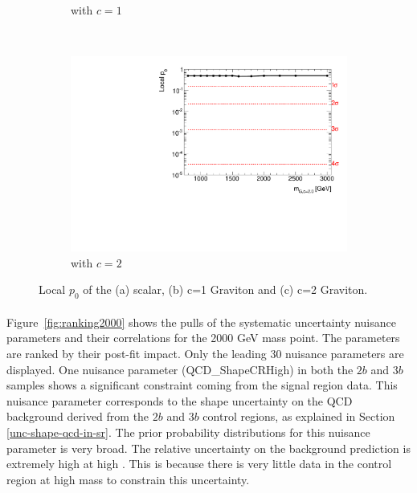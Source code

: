 \begin{figure}[htb!]
\begin{subfigure}[b]{0.35\textwidth}
        \caption{\Grav with $c=1$}
        \label{fig:localp0-g1}
    \end{subfigure}
    \\
    \hspace{-2.5cm}
    \begin{subfigure}[b]{0.35\textwidth}
        \includegraphics[width=\textwidth,angle=-90]{figures/boosted/results/p0_g20_allmasses_boosted.pdf}
        \caption{\Grav with $c=2$}
        \label{fig:localp0-g2}
    \end{subfigure}
  \caption{Local $p_0$ of the (a) scalar, (b) c=1 Graviton and (c) c=2 Graviton.}
  \label{fig:localp0}
\end{figure}

\paragraph{}
Figure~\ref{fig:ranking2000} shows the pulls of the systematic uncertainty nuisance parameters and their correlations for the 2000 GeV mass point. 
The parameters are ranked by their post-fit impact. 
Only the leading 30 nuisance parameters are displayed.
One nuisance parameter (QCD\_ShapeCRHigh) in both the $2b$ and $3b$ samples shows a significant constraint coming from the signal region data. 
This nuisance parameter corresponds to the shape uncertainty on the QCD background derived from the $2b$ and $3b$ control regions, as explained in Section \ref{unc-shape-qcd-in-sr}. 
The prior probability distributions for this nuisance parameter is very broad.
The relative uncertainty on the background prediction is extremely high at high \mtwoJ. 
This is because there is very little data in the control region at high mass to constrain this uncertainty.

